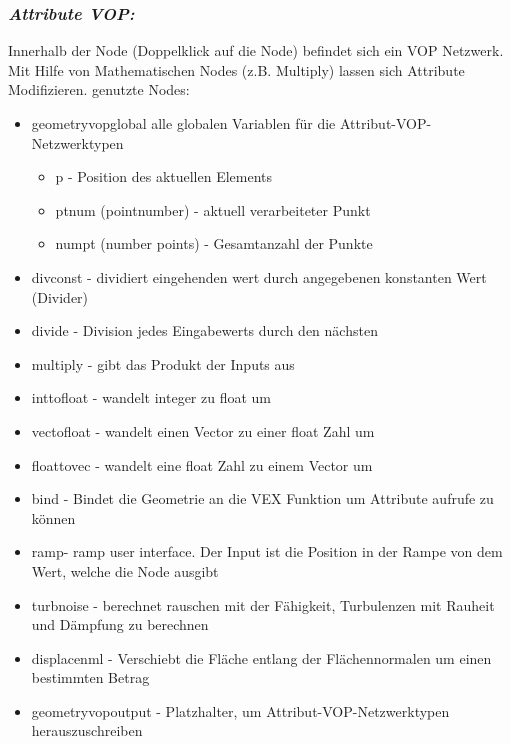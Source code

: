 \documentclass[paper=a4,fontsize=12pt,ngerman]{scrartcl}
\begin{document}
 	\subsubsection*{\textit{Attribute VOP:}}
 	Innerhalb der Node (Doppelklick auf die Node) befindet sich ein VOP Netzwerk. Mit Hilfe von Mathematischen Nodes (z.B. Multiply) lassen sich Attribute Modifizieren.
 	genutzte Nodes:
 	\begin{itemize}
 		\item geometryvopglobal 	alle globalen Variablen für die Attribut-VOP-Netzwerktypen
 		\begin{itemize}
 			\item p - Position des aktuellen Elements
 			\item ptnum (pointnumber) - aktuell verarbeiteter Punkt 
 			\item numpt (number points) - Gesamtanzahl der Punkte
 		\end{itemize}
 		\item divconst - dividiert eingehenden wert durch angegebenen konstanten Wert (Divider)
 		\item divide - Division jedes Eingabewerts durch den nächsten 
 		\item multiply	 - gibt das Produkt der Inputs aus
 		\item inttofloat - wandelt integer zu float um
 		\item vectofloat - wandelt einen Vector zu einer float Zahl um
 		\item floattovec - wandelt eine float Zahl zu einem Vector um
 		\item bind - Bindet die Geometrie an die VEX Funktion um Attribute aufrufe zu können
 		\item ramp- ramp user interface. Der Input ist die Position in der Rampe von dem Wert, welche die Node ausgibt
 		\item turbnoise - berechnet rauschen mit der Fähigkeit, Turbulenzen mit Rauheit und Dämpfung zu berechnen
 		\item displacenml - Verschiebt die Fläche entlang der Flächennormalen um einen bestimmten Betrag
 		\item geometryvopoutput - Platzhalter, um Attribut-VOP-Netzwerktypen herauszuschreiben
 	\end{itemize}
 	
\end{document}
